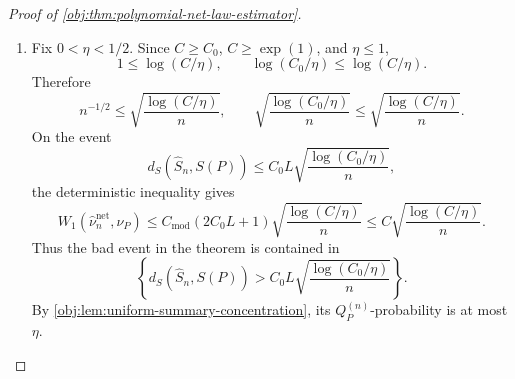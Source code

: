 \begin{proof}[Proof of \cref{obj:thm:polynomial-net-law-estimator}]
\begin{enumerate}
\item Fix \(0<\eta<1/2\).  Since \(C\ge C_0\), \(C\ge\exp(1)\), and
\(\eta\le1\),
\[
1\le \log(C/\eta),
\qquad
\log(C_0/\eta)\le \log(C/\eta).
\]
Therefore
\[
n^{-1/2}\le
\sqrt{\frac{\log(C/\eta)}{n}},
\qquad
\sqrt{\frac{\log(C_0/\eta)}{n}}
\le
\sqrt{\frac{\log(C/\eta)}{n}}.
\]
On the event
\[
d_S(\widehat S_n,S(P))
\le
C_0L\sqrt{\frac{\log(C_0/\eta)}{n}},
\]
the deterministic inequality gives
\[
W_1(\widehat\nu_n^{\mathrm{net}},\nu_P)
\le
C_{\mathrm{mod}}(2C_0L+1)
\sqrt{\frac{\log(C/\eta)}{n}}
\le
C\sqrt{\frac{\log(C/\eta)}{n}}.
\]
Thus the bad event in the theorem is contained in
\[
\left\{
d_S(\widehat S_n,S(P))
>
C_0L\sqrt{\frac{\log(C_0/\eta)}{n}}
\right\}.
\]
By \cref{obj:lem:uniform-summary-concentration}, its \(Q_P^{(n)}\)-probability
is at most \(\eta\). %
\end{enumerate}
\end{proof}
